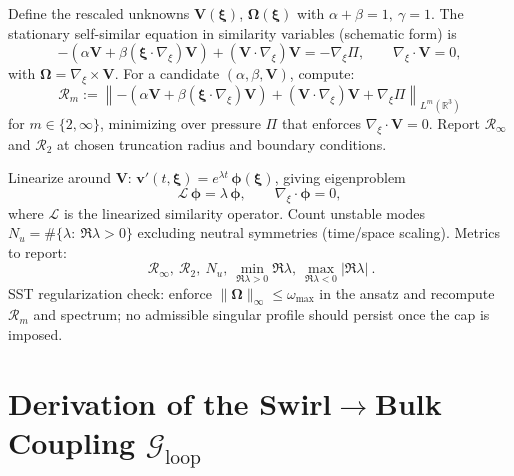 Define the rescaled unknowns \(\mathbf{V}(\boldsymbol{\xi})\), \(\boldsymbol{\Omega}(\boldsymbol{\xi})\) with \(\alpha+\beta=1,\ \gamma=1\).
The stationary self-similar equation in similarity variables (schematic form) is
\[
    -\left(\alpha \mathbf{V} + \beta (\boldsymbol{\xi}\!\cdot\!\nabla_{\!\xi})\mathbf{V}\right)
    + (\mathbf{V}\!\cdot\!\nabla_{\!\xi})\mathbf{V} = -\nabla_{\!\xi} \Pi,\qquad
    \nabla_{\!\xi}\!\cdot\!\mathbf{V}=0,
\]
with \(\boldsymbol{\Omega}=\nabla_{\!\xi}\times\mathbf{V}\).
For a candidate \((\alpha,\beta,\mathbf{V})\), compute:
\[
    \mathcal{R}_m := \left\lVert
                         -\left(\alpha \mathbf{V} + \beta (\boldsymbol{\xi}\!\cdot\!\nabla_{\!\xi})\mathbf{V}\right)
                         + (\mathbf{V}\!\cdot\!\nabla_{\!\xi})\mathbf{V} + \nabla_{\!\xi}\Pi
    \right\rVert_{L^m(\mathbb{R}^3)}
\]
for \(m\in\{2,\infty\}\), minimizing over pressure \(\Pi\) that enforces \(\nabla_{\!\xi}\!\cdot\!\mathbf{V}=0\).
Report \(\mathcal{R}_\infty\) and \(\mathcal{R}_2\) at chosen truncation radius and boundary conditions.

Linearize around \(\mathbf{V}\): \(\mathbf{v}'(t,\boldsymbol{\xi})=e^{\lambda t}\,\boldsymbol{\phi}(\boldsymbol{\xi})\), giving eigenproblem
\[
    \mathcal{L}\,\boldsymbol{\phi}=\lambda\,\boldsymbol{\phi},\qquad \nabla_{\!\xi}\!\cdot\!\boldsymbol{\phi}=0,
\]
where \(\mathcal{L}\) is the linearized similarity operator.
Count unstable modes \(N_u = \#\{\lambda:\ \Re\lambda>0\}\) excluding neutral symmetries (time/space scaling).
Metrics to report:
\[
    \boxed{
        \ \mathcal{R}_\infty,\ \mathcal{R}_2,\ N_u,\ \min_{\Re\lambda>0}\Re\lambda,\ \max_{\Re\lambda<0}|\Re\lambda|
        \ } .
\]
SST regularization check: enforce \(\lVert \boldsymbol{\Omega}\rVert_\infty\le \omega_{\max}\) in the ansatz and recompute \(\mathcal{R}_m\) and spectrum; no admissible singular profile should persist once the cap is imposed.

\section{Derivation of the Swirl$\to$Bulk Coupling \texorpdfstring{$\mathcal{G}_{\text{loop}}$}{G\_loop}}
\label{app:Gloop}

